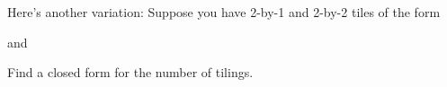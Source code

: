 Here's another variation:
Suppose you have 2-by-1 and 2-by-2 tiles of the form

and

Find a closed form for the number of tilings.
